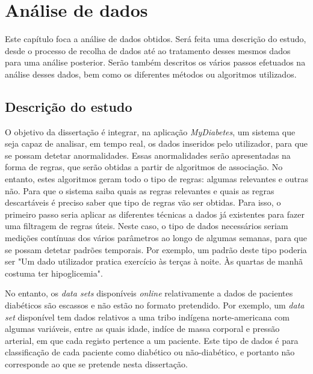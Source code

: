 \chapter{Análise de dados}\label{chap:dese}

Este capítulo foca a análise de dados obtidos. Será feita uma descrição do estudo, desde o processo de recolha de dados até ao tratamento desses mesmos dados para uma análise posterior. Serão também descritos os vários passos efetuados na análise desses dados, bem como os diferentes métodos ou algoritmos utilizados.

\section{Descrição do estudo}

O objetivo da dissertação é integrar, na aplicação \textit{MyDiabetes}, um sistema que seja capaz de analisar, em tempo real, os dados inseridos pelo utilizador, para que se possam detetar anormalidades. Essas anormalidades serão apresentadas na forma de regras, que serão obtidas a partir de algoritmos de associação. No entanto, estes algoritmos geram todo o tipo de regras: algumas relevantes e outras não. Para que o sistema saiba quais as regras relevantes e quais as regras descartáveis é preciso saber que tipo de regras vão ser obtidas. Para isso, o primeiro passo seria aplicar as diferentes técnicas a dados já existentes para fazer uma filtragem de regras úteis. Neste caso, o tipo de dados necessários seriam medições contínuas dos vários parâmetros ao longo de algumas semanas, para que se possam detetar padrões temporais. Por exemplo, um padrão deste tipo poderia ser "Um dado utilizador pratica exercício às terças à noite. Às quartas de manhã costuma ter hipoglicemia". 

No entanto, os \textit{data sets} disponíveis \textit{online} relativamente a dados de pacientes diabéticos são escassos e não estão no formato pretendido. Por exemplo, um \textit{data set} disponível tem dados relativos a uma tribo indígena norte-americana com algumas variáveis, entre as quais idade, indíce de massa corporal e pressão arterial, em que cada registo pertence a um paciente. Este tipo de dados é para classificação de cada paciente como diabético ou não-diabético, e portanto não corresponde ao que se pretende nesta dissertação. 

